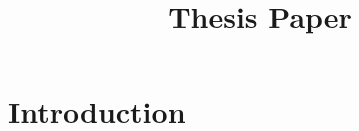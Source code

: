 \documentclass[12pt]{article}
\title{Thesis Paper}
\begin{document}
\maketitle
\section{Introduction}
\end{document}

